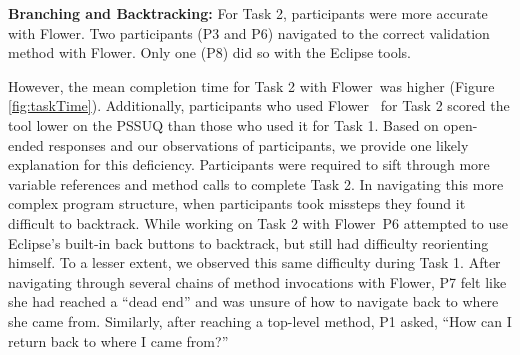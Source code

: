 \documentclass[conference]{IEEEtran}
\newcommand{\toolName}{Flower}
\begin{document}
\textbf{Branching and Backtracking:}
For Task 2, participants were more accurate with \toolName.
Two participants (P3 and P6) navigated to the correct validation method with \toolName.
Only one (P8) did so with the Eclipse tools.

However, the mean completion time for Task 2 with \toolName~was higher (Figure \ref{fig:taskTime}).
Additionally, participants who used \toolName~ for Task 2 scored the tool lower on the PSSUQ than those who used it for Task 1.
Based on open-ended responses and our observations of participants, we provide one likely explanation for this deficiency.
Participants were required to sift through more variable references and method calls to complete Task 2.
In navigating this more complex program structure, when participants took missteps they found it difficult to backtrack.
While working on Task 2 with \toolName~P6 attempted to use Eclipse's built-in back buttons to backtrack, but still had difficulty reorienting himself. 
To a lesser extent, we observed this same difficulty during Task 1.
After navigating through several chains of method invocations with \toolName, P7 felt like she had reached a ``dead end'' and was unsure of how to navigate back to where she came from.
Similarly, after reaching a top-level method, P1 asked, ``How can I return back to where I came from?''





\end{document}
